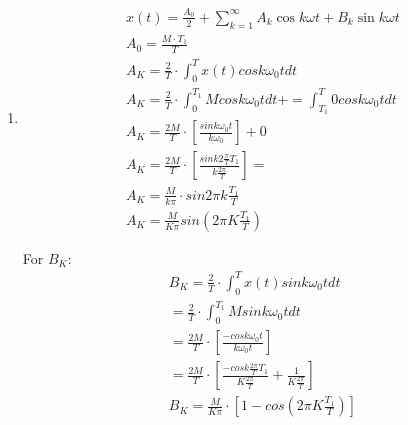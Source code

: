 \documentclass[10pt,a4paper, margin=1in]{article}
\begin{document}
\begin{enumerate}
\item %
\begin{align*}
    x(t) = \frac{A_0}{2} + \sum_{k=1}^{\infty} A_k\cos{k\omega t} + B_k\sin{k\omega t} \\
    A_0 = \frac{M\cdot T_1}{T}\\
    A_K = \frac{2}{T} \cdot \int^{T}_{0} x(t) cosk \omega_0 t dt \\
    A_K = \frac{2}{T} \cdot \int^{T_1}_{0} M cosk \omega_0 t dt += \int^{T}_{T_1} 0 cosk \omega_0 t dt\\
    A_K = \frac{2M}{T} \cdot [\frac{sink\omega_0 t}{k\omega_0}] + 0\\
    A_K = \frac{2M}{T} \cdot [\frac{sink 2\frac{\pi}{T}T_1}{k\frac{2\pi}{T}}] =   \\
    A_K = \frac{M}{k\pi}\cdot sin 2\pi k \frac{T_1}{T}\\
    A_K = \frac{M}{K \pi} sin(2\pi K \frac{T_1}{T})
\end{align*}

For $B_K$:
\begin{align*}
    B_K = \frac{2}{T} \cdot \int^{T}_{0} x(t) sink \omega_0 t dt \\
    = \frac{2}{T} \cdot \int^{T_1}_{0} M sink \omega_0 t dt \\
    = \frac{2M}{T} \cdot  [\frac{- cos k \omega_0 t }{k \omega_0 t }] \\
    = \frac{2M}{T} \cdot [\frac{- cos k \frac{2\pi}{T} T_1 }{K \frac{2\pi}{T} } + \frac{1}{K \frac{2\pi}{T}}] \\
    B_K = \frac{M}{K\pi} \cdot [1 - cos(2\pi K \frac{ T_1}{T})]
\end{align*}



\end{enumerate}
\end{document}
